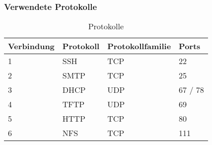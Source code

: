 \subsubsection{Verwendete Protokolle}
\begin{table}[H]
\centering
\begin{tabular}{p{2cm}p{4cm}p{5cm}p{5cm}}
\hline
\rowcolor{heading} \textbf{Verbindung} & \textbf{Protokoll} & \textbf{Protokollfamilie} & \textbf{Ports} \\\hline
1 & SSH & TCP & 22 \\\hline
2 & SMTP & TCP & 25 \\\hline
3 & DHCP & UDP & 67 / 78 \\\hline
4 & TFTP & UDP & 69 \\\hline
5 & HTTP & TCP & 80 \\\hline
6 & NFS & TCP & 111 \\\hline
\end{tabular}
\caption{Protokolle}
\end{table}
